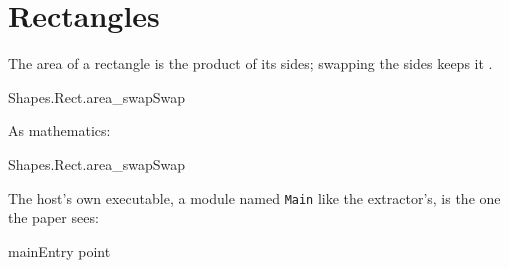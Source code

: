 \documentclass{article}
\begin{document}
\section{Rectangles}

The area of a rectangle is the product of its sides; swapping the sides
keeps it .

\begin{leanblock}[sum=v80Pqxg1yV]{Shapes.Rect.area_swap}{Swap}
\end{leanblock}

As mathematics:
\begin{leanblock}[view=math, sum=rtzvrpiUKQ]{Shapes.Rect.area_swap}{Swap}
\end{leanblock}

The host's own executable, a module named \texttt{Main} like the
extractor's, is the one the paper sees:
\begin{leanblock}[view=lean, sum=7Df85bEOvD]{main}{Entry point}
\end{leanblock}
\end{document}
